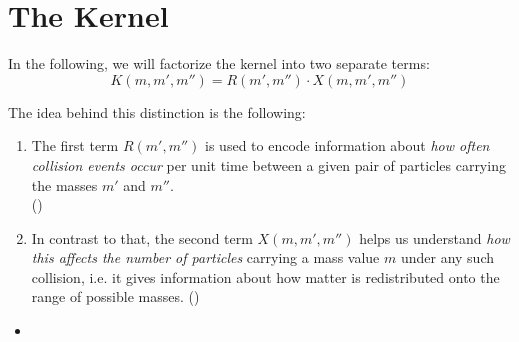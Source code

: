 
\newpage\section{The Kernel}

    In the following, we will factorize the kernel into two separate terms:
    \begin{equation}
        K(m,m',m'') = R(m',m'') \cdot X(m,m',m'') 
    \end{equation}

    The idea behind this distinction is the following: 
    \begin{enumerate}
        \item The first term $R(m',m'')$ is used to encode information about 
            \textit{how often collision events occur} per unit time between a given
            pair of particles carrying the masses $m'$ and $m''$. \\
            ()
        \item In contrast to that, the second term $X(m,m',m'')$ helps us understand 
            \textit{how this affects the number of particles} carrying a mass value $m$ under any
            such collision, i.e. it gives information about how matter is redistributed onto the
            range of possible masses.
            ()
    \end{enumerate}


    \begin{itemize}
        \item {}
    \end{itemize}




